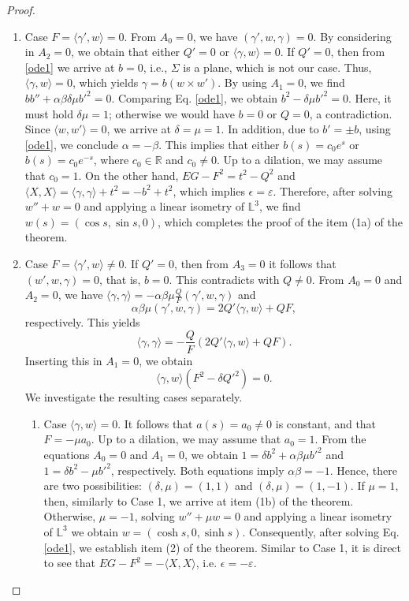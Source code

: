 \documentclass[10pt,a4paper]{amsart}
\def\l{\mathbb L}
\def\r{\mathbb R}
\begin{document}
\begin{proof}
\begin{enumerate}
\item  Case $F=\langle \gamma',w \rangle =0$. From $A_0=0$, we have $(\gamma',w,\gamma)=0$. By considering in $A_2=0$, we obtain that either $Q'=0$ or $\langle \gamma,w \rangle =0$. If $Q'=0$, then from \eqref{ode1} we arrive at $b=0$, i.e., $\Sigma$ is a plane, which is not our case. Thus,   $\langle \gamma,w \rangle =0$, which yields   $\gamma=b (w\times w')$. By using $A_1=0$, we find $bb''+\alpha \beta\delta\mu b'^2=0$. Comparing Eq. \eqref{ode1}, we obtain $b^2-\delta\mu b'^2=0$. Here, it must hold $\delta\mu=1$; otherwise we would have $b=0$ or $Q=0$, a contradiction. Since $\langle w,w'\rangle =0$, we arrive at $\delta=\mu=1.$ In addition, due to $b'=\pm b$, using \eqref{ode1}, we conclude $\alpha=-\beta$. This implies that either $b(s)=c_0e^s$ or $b(s)=c_0e^{-s}$, where $c_0 \in \r$ and $c_0 \neq 0$. Up to a dilation, we may assume that $c_0=1$. On the other hand, $EG-F^2=t^2-Q^2$ and $\langle X,X\rangle=\langle \gamma,\gamma\rangle+t^2=-b^2+t^2$, which implies $\epsilon=\varepsilon$. Therefore, after solving $w''+w=0$ and applying a linear isometry of $\l^3$, we find $w(s)=(\cos s, \sin s, 0)$, which completes the proof of the item (1a) of the theorem.

\item Case $F=\langle \gamma',w \rangle \neq 0$. If $Q'=0$, then from $A_3=0$ it follows that $(w',w,\gamma)=0$, that is, $b=0.$ This contradicts with $Q\neq 0$. From $A_0=0$ and $A_2=0$, we have $\langle \gamma, \gamma \rangle=-\alpha\beta\mu\frac{Q}{F}(\gamma',w,\gamma)$ and 
\begin{equation*}
\alpha\beta\mu(\gamma',w,\gamma)=2Q'\langle \gamma, w \rangle+QF,
\end{equation*}
respectively. This yields   
\begin{equation}
\langle \gamma, \gamma \rangle=-\frac{Q}{F}(2Q'\langle \gamma, w \rangle+QF). \label{qf}
\end{equation}
Inserting this in $A_1=0$, we obtain 
$$\langle \gamma, w \rangle (F^2-\delta Q'^2)=0.$$ 
We investigate the resulting cases separately.

\begin{enumerate}
\item Case $\langle \gamma, w \rangle = 0$. It follows that $a(s)=a_0\not=0$ is constant, and that $F = -\mu a_0$. Up to a dilation, we may assume that $a_0=1$. From the equations $A_0 = 0$ and $A_1=0$, we obtain $1= \delta b^2 + \alpha \beta \mu b'^2$  and $1= \delta b^2 - \mu b'^2$, respectively. Both equations imply  $\alpha \beta = -1$. Hence, there are two possibilities: $(\delta,\mu)=(1,1)$ and $(\delta,\mu)=(1,-1)$. If $\mu=1$, then, similarly to Case 1, we arrive at item (1b) of the theorem. Otherwise, $\mu=-1$,  solving $w''+\mu w=0$ and applying a linear isometry of $\l^3$ we obtain $w=(\cosh s, 0 , \sinh s).$ Consequently, after solving Eq.  \eqref{ode1}, we establish item (2) of the theorem. Similar to Case 1, it is direct to see that $EG-F^2=-\langle X,X\rangle$, i.e. $\epsilon=-\varepsilon$.


\end{enumerate}
\end{enumerate}
\end{proof}
\end{document}
